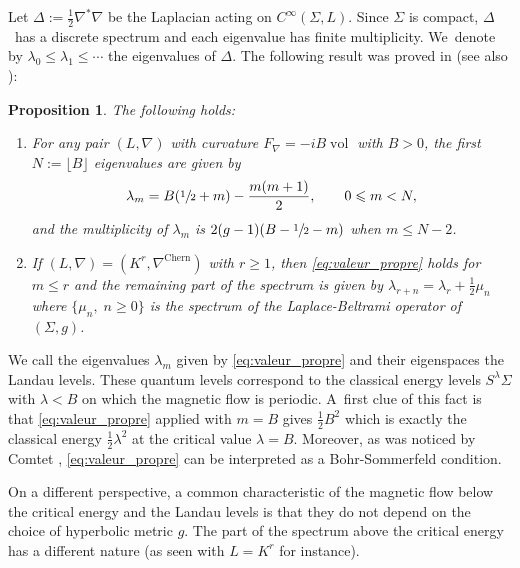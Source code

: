 \documentclass[10pt,a4paper]{amsart}
\theoremstyle{plain}
\newtheorem{proposition}[theorem]{Proposition}
\theoremstyle{definition}
\let\op\operatorname
\let\la\lambda
\let\Si\Sigma
\begin{document}
Let $\Delta := \frac{1}{2} \nabla^* \nabla $ be the Laplacian acting on $C^\infty
(\Si, L)$. Since $\Si$ is compact, $\Delta$~has a discrete spectrum and each
eigenvalue has finite multiplicity. We~denote by $\la_0 \leqslant \la_1
\leqslant \cdots $ the eigenvalues of $\Delta$. The following result was
proved in \cite{Iengo-Li-94} (see also \cite{Tejero-06, Landau2}):

\begin{proposition} \label{theo:Landau_Level}
The following holds:
\begin{enumerate}

\item For any pair $(L, \nabla)$ with curvature $F_\nabla=-iB
\op{vol}$ with $B>0$, the first $N := \lfloor B \rfloor $ eigenvalues are
given by
\begin{gather} \label{eq:valeur_propre}
\la_{m } = B (\sfrac{1}{2} + m) - \dfrac{ m (m+1) } {2},\qquad 0
\leqslant m < N,
\end{gather}
and the multiplicity of $\la_m$ is $2 (\textsl{g}-1)(B-\sfrac{1}{2} - m)$ when $m \leqslant N- 2$.

\item If $(L,\nabla) = (K^r,\nabla^{\mathrm{Chern}})$ with $ r \geq 1$, then \eqref{eq:valeur_propre} holds for
$m \leqslant r$ and the remaining part of the spectrum is given by
$\la_{r+n} = \la_r + \frac{1}{2} \mu_n$ where $\{ \mu_n, \; n \geq 0 \}$ is the
spectrum of the Laplace-Beltrami operator of $(\Sigma, g)$.
\end{enumerate}
\end{proposition}

We call the eigenvalues $\la_m$ given by \eqref{eq:valeur_propre} and their eigenspaces the Landau levels.
These quantum levels correspond to the classical energy
levels $S^\lambda \Si$ with $\lambda <B$ on which the magnetic flow is periodic. A~first
clue of this fact is that \eqref{eq:valeur_propre} applied with $m = B$ gives $\frac{1}{2} B^2$ which is exactly the classical
energy $\frac{1}{2} \lambda^2$ at the critical value $\lambda =B$.
Moreover, as was noticed by Comtet \cite{Comtet-86}, \eqref{eq:valeur_propre} can be interpreted as a
Bohr-Sommerfeld condition.

On a different perspective, a common characteristic
of the magnetic flow below the critical energy and the Landau levels is
that they do not depend on the choice of hyperbolic metric $g$. The part of the spectrum above the
critical energy has a different nature (as seen with $L = K^r$ for instance).
\end{document}
